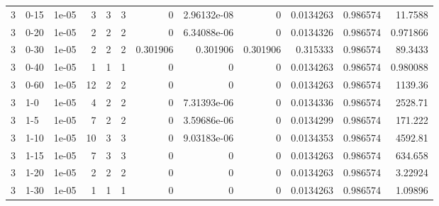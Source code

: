 \begin{tabular}{rlrrrrrrrrrr}
     3 & 0-15   &      1e-05 &           3 &                 3 &                 3 &     0           &     2.96132e-08 &      0           &        0.0134263 &               0.986574 &          11.7588   \\
     3 & 0-20   &      1e-05 &           2 &                 2 &                 2 &     0           &     6.34088e-06 &      0           &        0.0134326 &               0.986574 &           0.971866 \\
     3 & 0-30   &      1e-05 &           2 &                 2 &                 2 &     0.301906    &     0.301906    &      0.301906    &        0.315333  &               0.986574 &          89.3433   \\
     3 & 0-40   &      1e-05 &           1 &                 1 &                 1 &     0           &     0           &      0           &        0.0134263 &               0.986574 &           0.980088 \\
     3 & 0-60   &      1e-05 &          12 &                 2 &                 2 &     0           &     0           &      0           &        0.0134263 &               0.986574 &        1139.36     \\
     3 & 1-0    &      1e-05 &           4 &                 2 &                 2 &     0           &     7.31393e-06 &      0           &        0.0134336 &               0.986574 &        2528.71     \\
     3 & 1-5    &      1e-05 &           7 &                 2 &                 2 &     0           &     3.59686e-06 &      0           &        0.0134299 &               0.986574 &         171.222    \\
     3 & 1-10   &      1e-05 &          10 &                 3 &                 3 &     0           &     9.03183e-06 &      0           &        0.0134353 &               0.986574 &        4592.81     \\
     3 & 1-15   &      1e-05 &           7 &                 3 &                 3 &     0           &     0           &      0           &        0.0134263 &               0.986574 &         634.658    \\
     3 & 1-20   &      1e-05 &           2 &                 2 &                 2 &     0           &     0           &      0           &        0.0134263 &               0.986574 &           3.22924  \\
     3 & 1-30   &      1e-05 &           1 &                 1 &                 1 &     0           &     0           &      0           &        0.0134263 &               0.986574 &           1.09896  \\

\end{tabular}
